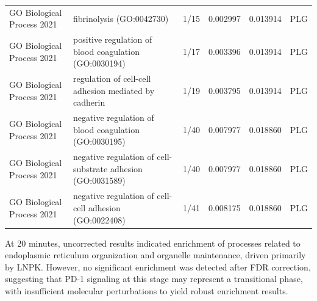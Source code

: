 \documentclass{article}
\begin{document}
\begin{table}[H]
{\begin{tabular}{@{}llcccc@{}}
              GO Biological Process 2021 & fibrinolysis (GO:0042730) & 1/15 & 0.002997 & 0.013914 & PLG \\
              GO Biological Process 2021 & positive regulation of blood coagulation (GO:0030194) & 1/17 & 0.003396 & 0.013914 & PLG \\
              GO Biological Process 2021 & regulation of cell-cell adhesion mediated by cadherin & 1/19 & 0.003795 & 0.013914 & PLG \\
              GO Biological Process 2021 & negative regulation of blood coagulation (GO:0030195) & 1/40 & 0.007977 & 0.018860 & PLG \\
              GO Biological Process 2021 & negative regulation of cell-substrate adhesion (GO:0031589) & 1/40 & 0.007977 & 0.018860 & PLG \\
              GO Biological Process 2021 & negative regulation of cell-cell adhesion (GO:0022408) & 1/41 & 0.008175 & 0.018860 & PLG \\ \bottomrule
            \end{tabular}
          }

        \end{table}

        At 20 minutes, uncorrected results indicated enrichment of processes related to endoplasmic reticulum organization and organelle maintenance, driven primarily by LNPK. However, no significant enrichment was detected after FDR correction, suggesting that PD-1 signaling at this stage may represent a transitional phase, with insufficient molecular perturbations to yield robust enrichment results.
\end{document}
